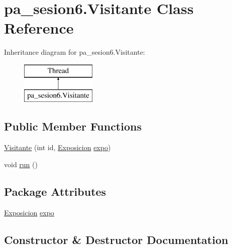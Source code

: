 \hypertarget{classpa__sesion6_1_1_visitante}{}\section{pa\+\_\+sesion6.\+Visitante Class Reference}
\label{classpa__sesion6_1_1_visitante}
Inheritance diagram for pa\+\_\+sesion6.\+Visitante\+:\begin{figure}[H]
\begin{center}
\leavevmode
\includegraphics[height=2.000000cm]{classpa__sesion6_1_1_visitante}
\end{center}
\end{figure}
\subsection*{Public Member Functions}
\begin{DoxyCompactItemize}
\item 
\mbox{\hyperlink{classpa__sesion6_1_1_visitante_acf989dbf6a8886b3be3b0ab4042b3b60}{Visitante}} (int id, \mbox{\hyperlink{classpa__sesion6_1_1_exposicion}{Exposicion}} \mbox{\hyperlink{classpa__sesion6_1_1_visitante_a09960f68f8c9a0d5d44bd607c11d6675}{expo}})
\item 
void \mbox{\hyperlink{classpa__sesion6_1_1_visitante_ac241b7a933b87a209c0c89b357a8d4ec}{run}} ()
\end{DoxyCompactItemize}
\subsection*{Package Attributes}
\begin{DoxyCompactItemize}
\item 
\mbox{\hyperlink{classpa__sesion6_1_1_exposicion}{Exposicion}} \mbox{\hyperlink{classpa__sesion6_1_1_visitante_a09960f68f8c9a0d5d44bd607c11d6675}{expo}}
\end{DoxyCompactItemize}


\subsection{Constructor \& Destructor Documentation}
\mbox{\label{classpa__sesion6_1_1_visitante_acf989dbf6a8886b3be3b0ab4042b3b60}} 
